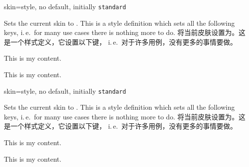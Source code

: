 \begin{docTcbKey}{skin}{=}{style, no default, initially \texttt{standard}}
\begin{stripedbox}
Sets the current skin to . This is a style definition which sets all the following
keys, i.\,e.\ for many use cases there is nothing more to do.
\tcblower
将当前皮肤设置为。这是一个样式定义，它设置以下键，
i.\,e.\ 对于许多用例，没有更多的事情要做。
\end{stripedbox}

\begin{dispExample}

\begin{tcolorbox}[adjusted title=adjusted皮肤]
  This is my content.
\end{tcolorbox}
\begin{tcolorbox}[beamer,adjusted title=beamer皮肤]
  This is my content.
\end{tcolorbox}
\end{dispExample}
\end{docTcbKey}

\begin{docTcbKey}{skin}{=}{style, no default, initially \texttt{standard}}
  \begin{stripedbox}
  Sets the current skin to . This is a style definition which sets all the following
  keys, i.\,e.\ for many use cases there is nothing more to do.
  \tcblower
  将当前皮肤设置为。这是一个样式定义，它设置以下键，
  i.\,e.\ 对于许多用例，没有更多的事情要做。
  \end{stripedbox}
  
  \begin{dispExample}
  
  \begin{tcolorbox}[adjusted title=adjusted皮肤]
  This is my content.
  \end{tcolorbox}
  \begin{tcolorbox}[beamer,adjusted title=beamer皮肤]
  This is my content.
  \end{tcolorbox}
  \end{dispExample}
  \end{docTcbKey}

